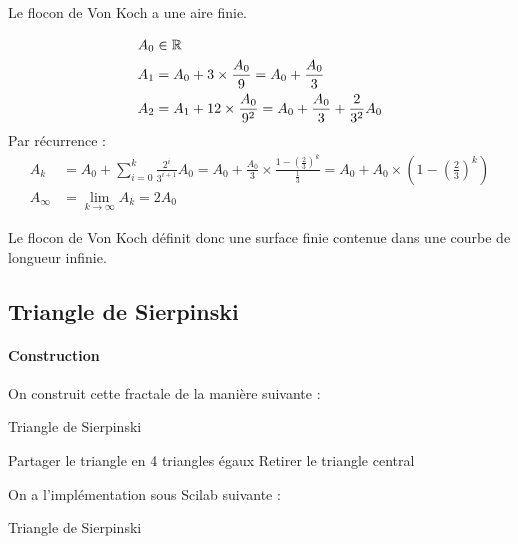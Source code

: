 	    	\begin{propShort}
	    		Le flocon de Von Koch a une aire finie.
	    	\end{propShort}
	    	\begin{preuve}
				\begin{align*}
					A_0 &\in \mathbb{R}	\\
					A_1 &= A_0 + 3\times\frac{A_0}{9} = A_0 + \frac{A_0}{3} 	\\
					A_2 &= A_1 + 12\times\frac{A_0}{9^2} = A_0 + \frac{A_0}{3} + \frac{2}{3^2}A_0	\\
				\end{align*}
				Par récurrence :
				\begin{align*}
				 A_k &= A_0 + \sum_{i=0}^{k}\frac{2^i}{3^{i+1}}A_0 = A_0 + \frac{A_0}{3} \times \frac{1-\left(\frac{2}{3}\right)^k}{\frac{1}{3}} = A_0 + A_0 \times \left(1-\left(\frac{2}{3}\right)^k\right) \\
				 A_\infty &= \lim_{k\to\infty} A_k = 2A_0
				\end{align*}
	    	\end{preuve}

			Le flocon de Von Koch définit donc une surface finie contenue dans une courbe de longueur infinie.

	\subsection{Triangle de Sierpinski}
		
		\paragraph{Construction}
			
			On construit cette fractale de la manière suivante :

			\begin{algorithm}[H]
			\DontPrintSemicolon
			\caption{Triangle de Sierpinski}
				{
					Partager le triangle en 4 triangles égaux\;
					Retirer le triangle central\;
				}
			\end{algorithm}

			On a l'implémentation sous Scilab suivante :
			\begin{listing}[H]
				\caption{Triangle de Sierpinski}
				\label{code-2-triangleSierpinskiRecursif}
			\end{listing}

